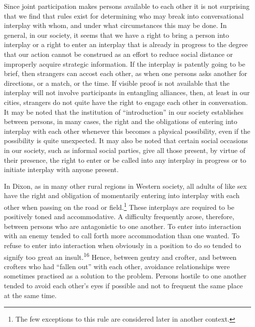 \documentclass[openany,nobib]{tufte-book}
\begin{document}
Since joint participation makes persons available to each other it is
not surprising that we find that rules exist for determining who may
break into conversational interplay with whom, and under what
circumstances this may be done. In general, in our society, it seems
that we have a right to bring a person into interplay or a right to
enter an interplay that is already in progress to the degree that our
action cannot be construed as an effort to reduce social distance or
improperly acquire strategic information. If the interplay is patently
going to be brief, then strangers can accost each other, as when one
persons asks another for directions, or a match, or the time. If visible
proof is not available that the interplay will not involve participants
in entangling alliances, then, at least in our cities, strangers do not
quite have the right to engage each other in conversation. It may be
noted that the institution of ``introduction'' in our society
establishes between persons, in many cases, the right and the
obligations of entering into interplay with each other whenever this
becomes a physical possibility, even if the possibility is quite
unexpected. It may also be noted that certain social occasions in our
society, such as informal social parties, give all those present, by
virtue of their presence, the right to enter or be called into any
interplay in progress or to initiate interplay with anyone present.

In Dixon, as in many other rural regions in Western society, all adults
of like sex have the right and obligation of momentarily entering into
interplay with each other when passing on the road or field.\footnote{The
  few exceptions to this rule are considered later in another context.}
These interplays are required to be positively toned and accommodative.
A difficulty frequently arose, therefore, between persons who are
antagonistic to one another. To enter into interaction with an enemy
tended to call forth more accommodation than one wanted. To refuse to
enter into interaction when obviously in a position to do so tended to
signify too great an insult.\textsuperscript{16} Hence, between gentry and
crofter, and between crofters who had ``fallen out'' with each other,
avoidance relationships were sometimes practised as a solution to the
problem. Persons hostile to one another tended to avoid each other's
eyes if possible and not to frequent the same place at the same time.
\end{document}
